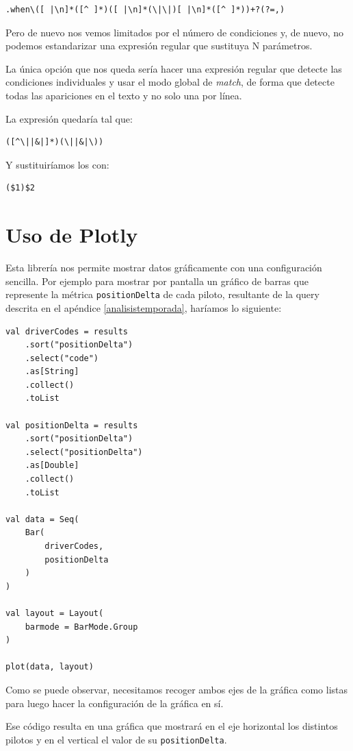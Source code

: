 \documentclass[12pt,twoside,titlepage]{report}
\begin{document}
\begin{lstlisting}
.when\([ |\n]*([^ ]*)([ |\n]*(\|\|)[ |\n]*([^ ]*))+?(?=,)
\end{lstlisting}

Pero de nuevo nos vemos limitados por el número de condiciones y, de nuevo, no podemos estandarizar una expresión regular que sustituya N parámetros.

La única opción que nos queda sería hacer una expresión regular que detecte las condiciones individuales y usar el modo global de \textit{match}, de forma que detecte todas las apariciones en el texto y no solo una por línea.

La expresión quedaría tal que:

\begin{lstlisting}
([^\||&|]*)(\||&|\))
\end{lstlisting}

Y sustituiríamos los con:

\begin{lstlisting}
($1)$2
\end{lstlisting}

\section{Uso de Plotly}
\label{plotly}

Esta librería nos permite mostrar datos gráficamente con una configuración sencilla. Por ejemplo para mostrar por pantalla un gráfico de barras que represente la métrica \texttt{positionDelta} de cada piloto, resultante de la query descrita en el apéndice \ref{analisistemporada}, haríamos lo siguiente:

\begin{lstlisting}
val driverCodes = results
	.sort("positionDelta")
	.select("code")
	.as[String]
	.collect()
	.toList
	
val positionDelta = results
	.sort("positionDelta")
	.select("positionDelta")
	.as[Double]
	.collect()
	.toList
	
val data = Seq(
	Bar(
		driverCodes,  
		positionDelta
	)
)
	
val layout = Layout( 
	barmode = BarMode.Group
)
	
plot(data, layout)
\end{lstlisting}

Como se puede observar, necesitamos recoger ambos ejes de la gráfica como listas para luego hacer la configuración de la gráfica en sí.

Ese código resulta en una gráfica que mostrará en el eje horizontal los distintos pilotos y en el vertical el valor de su \texttt{positionDelta}.
\end{document}
